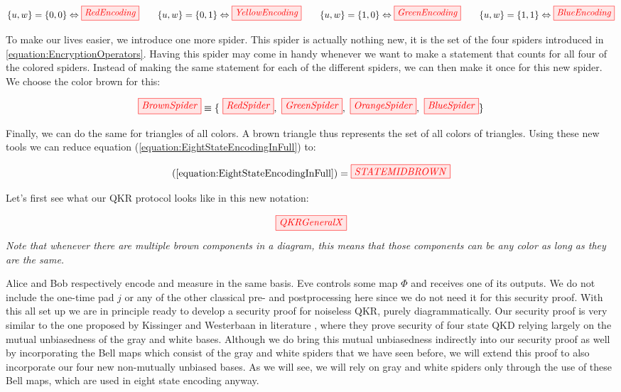 \documentclass[]{article}
\begin{document}
\begin{equation}
	\label{equation:EncryptionOperators}
	\{u,w\} = \{0, 0\} \Leftrightarrow \tikzfig{RedEncoding} ~~~~~~ \{u,w\} = \{0, 1\} \Leftrightarrow \tikzfig{YellowEncoding}~~~~~~ \{u,w\} = \{1, 0\} \Leftrightarrow \tikzfig{GreenEncoding}~~~~~~ \{u,w\} = \{1, 1\} \Leftrightarrow \tikzfig{BlueEncoding}
\end{equation}

To make our lives easier, we introduce one more spider. This spider is actually nothing new, it is the set of the four spiders introduced in \ref{equation:EncryptionOperators}. Having this spider may come in handy whenever we want to make a statement that counts for all four of the colored spiders. Instead of making the same statement for each of the different spiders, we can then make it once for this new spider. We choose the color brown for this:

\begin{equation}
\label{equation:brownspiderset}
\tikzfig{BrownSpider} \equiv \{~\tikzfig{RedSpider},~ \tikzfig{GreenSpider},~ \tikzfig{OrangeSpider},~ \tikzfig{BlueSpider}\}
\end{equation}

Finally, we can do the same for triangles of all colors. A brown triangle thus represents the set of all colors of triangles. Using these new tools we can reduce equation (\ref{equation:EightStateEncodingInFull}) to:

\begin{equation}
\label{equation:EightStateEncodingInFullBrown}
(\ref{equation:EightStateEncodingInFull}) = \tikzfig{STATEMIDBROWN}
\end{equation}

Let's first see what our QKR protocol looks like in this new notation:

\begin{equation}
	\label{equation:QKRGeneralFirstIntroduced}
	\tikzfig{QKRGeneralX}
\end{equation}
\textit{Note that whenever there are multiple brown components in a diagram, this means that those components can be any color as long as they are the same.}

Alice and Bob respectively encode and measure in the same basis. Eve controls some map $\Phi$ and receives one of its outputs. We do not include the one-time pad $j$ or any of the other classical pre- and postprocessing here since we do not need it for this security proof. With this all set up we are in principle ready to develop a security proof for noiseless QKR, purely diagrammatically. Our security proof is very similar to the one proposed by Kissinger and Westerbaan in literature \cite{Kissinger2017}, where they prove security of four state QKD relying largely on the mutual unbiasedness of the gray and white bases. Although we do bring this mutual unbiasedness indirectly into our security proof as well by incorporating the Bell maps which consist of the gray and white spiders that we have seen before, we will extend this proof to also incorporate our four new non-mutually unbiased bases. As we will see, we will rely on gray and white spiders only through the use of these Bell maps, which are used in eight state encoding anyway.
\end{document}
